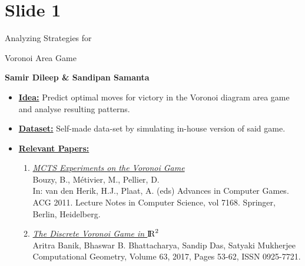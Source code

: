 \documentclass[10pt, xcolor=x11names,compress]{beamer}
\begin{document}
\section{Slide 1}
\begin{frame}[label=Background]{\centerline {Analyzing Strategies for } \centerline{Voronoi Area Game}}
\begin{center}
    \textbf{Samir Dileep \& Sandipan Samanta}
\end{center}
\begin{itemize}
    \item \underline{\textbf{Idea:}} Predict optimal moves for victory in the Voronoi diagram area game and analyse resulting patterns.
    \item \underline{\textbf{Dataset:}} Self-made data-set by simulating in-house version of said game.
    \item \underline{\textbf{Relevant Papers:}}
              \begin{enumerate}
              \scriptsize
                  \item \href{https://doi.org/10.1007/978-3-642-31866-5_9}{\textit{MCTS Experiments on the Voronoi Game}}\\
                  Bouzy, B., Métivier, M., Pellier, D. \\In: van den Herik, H.J., Plaat, A. (eds) Advances in Computer Games. ACG 2011. Lecture Notes in Computer Science, vol 7168. Springer, Berlin, Heidelberg.
                  \item \href{https://doi.org/10.1016/j.comgeo.2017.02.003}{\textit{The Discrete Voronoi Game in ${\rm I\!R}^2$}}\\
                  Aritra Banik, Bhaswar B. Bhattacharya, Sandip Das, Satyaki Mukherjee\\
                  Computational Geometry, Volume 63, 2017, Pages 53-62, ISSN 0925-7721.

              \end{enumerate}

    
\end{itemize} 
\vspace{18pt}
\end{frame}
\end{document}
